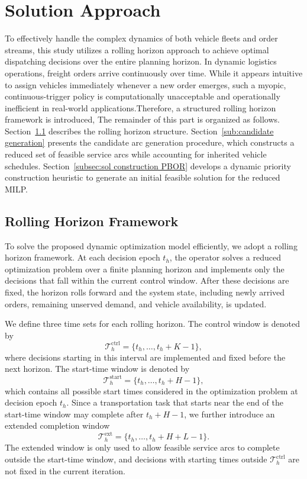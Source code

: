 \documentclass[10pt, reqno]{amsart}
\begin{document}
\section{Solution Approach}

To effectively handle the complex dynamics of both vehicle fleets and order streams, this study utilizes a rolling horizon approach to achieve optimal dispatching decisions over the entire planning horizon. In dynamic logistics operations, freight orders arrive continuously over time. While it appears intuitive to assign vehicles immediately whenever a new order emerges, such a myopic, continuous-trigger policy is computationally unacceptable and operationally inefficient in real-world applications.Therefore, a structured rolling horizon framework is introduced, The remainder of this part is organized as follows. Section~\ref{sub:rolling horizon} describes the rolling horizon structure. Section~\ref{sub:candidate generation} presents the candidate arc generation procedure, which constructs a reduced set of feasible service arcs while accounting for inherited vehicle schedules. Section~\ref{subsec:sol construction PBOR} develops a dynamic priority construction heuristic to generate an initial feasible solution for the reduced MILP. 

\subsection{Rolling Horizon Framework}\label{sub:rolling horizon}

To solve the proposed dynamic optimization model efficiently, we adopt a rolling horizon framework. At each decision epoch $t_h$, the operator solves a reduced optimization problem over a finite planning horizon and implements only the decisions that fall within the current control window. After these decisions are fixed, the horizon rolls forward and the system state, including newly arrived orders, remaining unserved demand, and vehicle availability, is updated.

We define three time sets for each rolling horizon. The control window is denoted by
\[
\mathcal T_h^{\mathrm{ctrl}}
=
\{t_h,\ldots,t_h+K-1\},
\]
where decisions starting in this interval are implemented and fixed before the next horizon. The start-time window is denoted by
\[
\mathcal T_h^{\mathrm{start}}
=
\{t_h,\ldots,t_h+H-1\},
\]
which contains all possible start times considered in the optimization problem at decision epoch $t_h$. Since a transportation task that starts near the end of the start-time window may complete after $t_h+H-1$, we further introduce an extended completion window
\[
\mathcal T_h^{\mathrm{ext}}
=
\{t_h,\ldots,t_h+H+L-1\}.
\]
The extended window is only used to allow feasible service arcs to complete outside the start-time window, and decisions with starting times outside $\mathcal T_h^{\mathrm{ctrl}}$ are not fixed in the current iteration.
\end{document}
